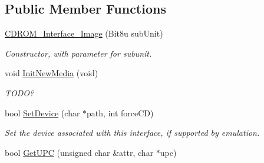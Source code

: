 \subsection*{Public Member Functions}
\begin{DoxyCompactItemize}
\item 
\hypertarget{classCDROM__Interface__Image_acecb6b00f509aba4e203b7bb5c4653fb}{\hyperlink{classCDROM__Interface__Image_acecb6b00f509aba4e203b7bb5c4653fb}{C\-D\-R\-O\-M\-\_\-\-Interface\-\_\-\-Image} (Bit8u sub\-Unit)}\label{classCDROM__Interface__Image_acecb6b00f509aba4e203b7bb5c4653fb}

\begin{DoxyCompactList}\small\item\em Constructor, with parameter for subunit. \end{DoxyCompactList}\item 
\hypertarget{classCDROM__Interface__Image_a8b1323ddfae9e59fae8fa5d8f862c8c4}{void \hyperlink{classCDROM__Interface__Image_a8b1323ddfae9e59fae8fa5d8f862c8c4}{Init\-New\-Media} (void)}\label{classCDROM__Interface__Image_a8b1323ddfae9e59fae8fa5d8f862c8c4}

\begin{DoxyCompactList}\small\item\em T\-O\-D\-O? \end{DoxyCompactList}\item 
\hypertarget{classCDROM__Interface__Image_ae803cb47966de3b637c55c40aaf89e78}{bool \hyperlink{classCDROM__Interface__Image_ae803cb47966de3b637c55c40aaf89e78}{Set\-Device} (char $\ast$path, int force\-C\-D)}\label{classCDROM__Interface__Image_ae803cb47966de3b637c55c40aaf89e78}

\begin{DoxyCompactList}\small\item\em Set the device associated with this interface, if supported by emulation. \end{DoxyCompactList}\item 
\hypertarget{classCDROM__Interface__Image_a0f4704db65cd97e70da4ee7464e535b0}{bool \hyperlink{classCDROM__Interface__Image_a0f4704db65cd97e70da4ee7464e535b0}{Get\-U\-P\-C} (unsigned char \&attr, char $\ast$upc)}\label{classCDROM__Interface__Image_a0f4704db65cd97e70da4ee7464e535b0}


\end{DoxyCompactItemize}
